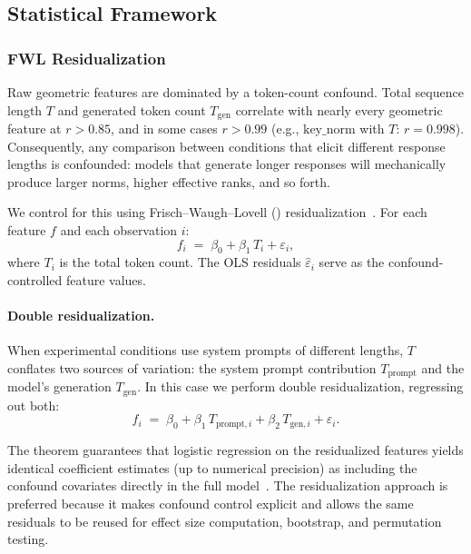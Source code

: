 \subsection{Statistical Framework}
\label{sec:statistical-framework}

\subsubsection{FWL Residualization}
\label{sec:fwl}

Raw geometric features are dominated by a token-count confound.
Total sequence length $T$ and generated token count $T_{\mathrm{gen}}$ correlate with nearly every geometric feature at $r > 0.85$, and in some cases $r > 0.99$ (e.g., $\mathrm{key\_norm}$ with $T$: $r = 0.998$).
Consequently, any comparison between conditions that elicit different response lengths is confounded: models that generate longer responses will mechanically produce larger norms, higher effective ranks, and so forth.

We control for this using Frisch--Waugh--Lovell (\fwl) residualization~\cite{frisch1933,lovell1963seasonal}.
For each feature $f$ and each observation $i$:
\begin{equation}
  f_i \;=\; \beta_0 + \beta_1\, T_i + \varepsilon_i,
  \label{eq:fwl-ols}
\end{equation}
where $T_i$ is the total token count.
The OLS residuals $\hat{\varepsilon}_i$ serve as the confound-controlled feature values.

\paragraph{Double residualization.}
When experimental conditions use system prompts of different lengths, $T$ conflates two sources of variation: the system prompt contribution $T_{\mathrm{prompt}}$ and the model's generation $T_{\mathrm{gen}}$.
In this case we perform double residualization, regressing out both:
\begin{equation}
  f_i \;=\; \beta_0 + \beta_1\, T_{\mathrm{prompt},i} + \beta_2\, T_{\mathrm{gen},i} + \varepsilon_i.
  \label{eq:fwl-double}
\end{equation}

The \fwl theorem guarantees that logistic regression on the residualized features yields identical coefficient estimates (up to numerical precision) as including the confound covariates directly in the full model~\cite{frisch1933}.
The residualization approach is preferred because it makes confound control explicit and allows the same residuals to be reused for effect size computation, bootstrap, and permutation testing.

